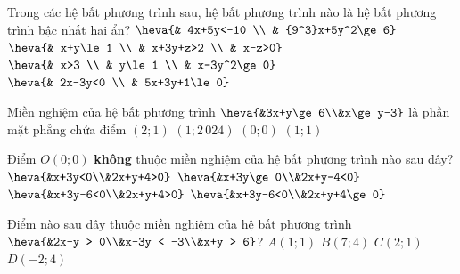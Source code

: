 \begin{ex}%
	 Trong các hệ bất phương trình sau, hệ bất phương trình nào là hệ bất phương trình bậc nhất hai ẩn?
	\choice 
		 { $\heva{& 4x+5y<-10 \\
		 & {9^3}x+5y^2\ge 6}$ }
		{ $\heva{& x+y\le 1  \\
		& x+3y+z>2 \\ 
		&  x-z>0} $}
		{ $\heva{& x>3 \\ 
		& y\le 1  \\
		& x-3y^2\ge  0}$}
		{\True $\heva{& 2x-3y<0 \\ 
		 & 5x+3y+1\le 0}$}
\end{ex}

\begin{ex}%
	Miền nghiệm của hệ bất phương  trình $\heva{&3x+y\ge 6\\&x\ge y-3}$ là phần mặt phẳng chứa điểm
	\choice 
		{\True  $(2;1)$}
		 {$(1;2\,024)$}
		 {$(0;0)$}
		 {$(1;1)$}
\end{ex}

\begin{ex}%
	Điểm $O(0;0)$ \textbf{không} thuộc  miền nghiệm của hệ bất phương trình nào sau đây?
	\choice 
		{\True  $\heva{&x+3y<0\\&2x+y+4>0}$}
		{$\heva{&x+3y\ge  0\\&2x+y-4<0}$}
		 {$\heva{&x+3y-6<0\\&2x+y+4>0}$}
		{$\heva{&x+3y-6<0\\&2x+y+4\ge 0}$} 
\end{ex}

\begin{ex}%
	 Điểm nào sau đây thuộc miền nghiệm của hệ bất phương trình $\heva{&2x-y > 0\\&x-3y < -3\\&x+y > 6}$?
	 \choice
		{$A(1;1)$} 
		 {\True $B(7;4)$}
		 {$C(2;1)$}
		{$D(-2;4)$} 
\end{ex}

